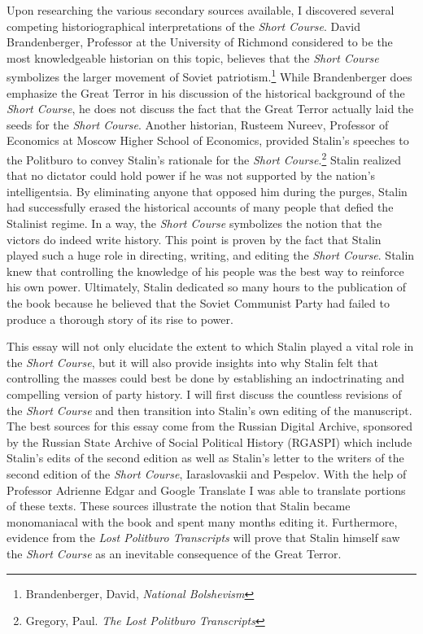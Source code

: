 \documentclass[a4paper, twocolumn]{article}
\begin{document}
Upon researching the various secondary sources available, I discovered
several competing historiographical interpretations of the \emph{Short
Course}. David Brandenberger, Professor at the University of Richmond
considered to be the most knowledgeable historian on this topic,
believes that the \emph{Short Course} symbolizes the larger movement of
Soviet patriotism.\footnote{Brandenberger, David, \emph{National Bolshevism}} While Brandenberger does emphasize the Great
Terror in his discussion of the historical background of the \emph{Short
Course}, he does not discuss the fact that the Great Terror actually
laid the seeds for the \emph{Short Course}. Another historian, Rusteem
Nureev, Professor of Economics at Moscow Higher School of Economics,
provided Stalin's speeches to the Politburo to convey Stalin's
rationale for the \emph{Short Course}.\footnote{Gregory, Paul. \emph{The Lost Politburo Transcripts}} Stalin realized that no dictator
could hold power if he was not supported by the nation's
intelligentsia. By eliminating anyone that opposed him during the
purges, Stalin had successfully erased the historical accounts of many
people that defied the Stalinist regime. In a way, the \emph{Short Course}
symbolizes the notion that the victors do indeed write history. This
point is proven by the fact that Stalin played such a huge role in
directing, writing, and editing the \emph{Short Course}. Stalin knew that
controlling the knowledge of his people was the best way to reinforce
his own power. Ultimately, Stalin dedicated so many hours to the
publication of the book because he believed that the Soviet Communist Party
had failed to produce a thorough story of its rise to power.

This essay will not only elucidate the extent to which Stalin played a
vital role in the \emph{Short Course}, but it will also provide insights into
why Stalin felt that controlling the masses could best be done by
establishing an indoctrinating and compelling version of party
history. I will first discuss the countless revisions of the \emph{Short
Course} and then transition into Stalin's own editing of the
manuscript. The best sources for this essay come from the Russian
Digital Archive, sponsored by the Russian State Archive of Social
Political History (RGASPI) which include Stalin's edits of the second
edition as well as Stalin's letter to the writers of the second
edition of the \emph{Short Course}, Iaraslovaskii and Pespelov. With the help
of Professor Adrienne Edgar and Google Translate I was able to
translate portions of these texts. These sources illustrate
the notion that Stalin became monomaniacal with the book and
spent many months editing it. Furthermore, evidence from the \emph{Lost
Politburo Transcripts} will prove that Stalin himself saw the
\emph{Short Course} as an inevitable consequence of the Great Terror.
\end{document}
